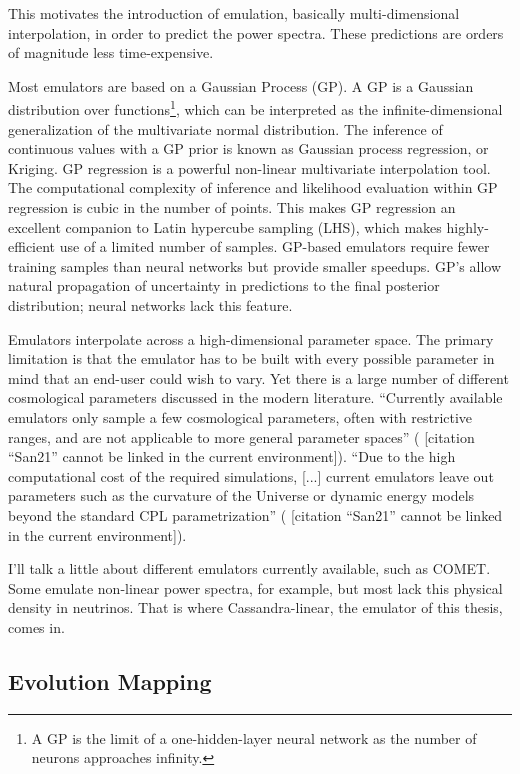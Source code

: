 \documentclass[11pt]{article}
\newcommand{\cbib}[1]
{\IfFileExists{biblatex.sty}
{\cite{#1}}
{[citation ``#1'' cannot be linked in the current environment]}}
\begin{document}
This motivates the introduction of emulation, basically multi-dimensional interpolation, in order to predict the power spectra. These predictions are orders of magnitude less time-expensive. 

Most emulators are based on a Gaussian Process (GP). A GP is a Gaussian
distribution over functions\footnote
{A GP is the limit of a one-hidden-layer neural network as the number of
neurons approaches infinity.}, which can be interpreted
as the infinite-dimensional generalization of the multivariate normal
distribution. The inference of continuous values with a GP prior
is known as Gaussian process regression, or Kriging. GP regression is a
powerful non-linear multivariate interpolation tool. The computational
complexity of inference and likelihood evaluation within GP regression is cubic
in the number of points. This makes GP regression an excellent companion to
Latin hypercube sampling (LHS), which makes highly-efficient use of a limited number of samples. GP-based emulators require fewer training samples than
neural networks but provide smaller speedups. GP's allow natural propagation of
uncertainty in predictions to the final posterior distribution; neural
networks lack this feature.

Emulators interpolate across a high-dimensional parameter space. The primary
limitation is that the emulator has to be built with every possible parameter
in mind that an end-user could wish to vary. Yet there is a large number of
different cosmological parameters discussed in the modern literature.
``Currently available emulators only sample a few cosmological parameters,
often with restrictive ranges, and are not applicable to more general parameter
spaces'' (\cbib{San21}). ``Due to the high computational cost of the required
simulations, [...] current emulators leave out parameters such as the curvature
of the Universe or dynamic energy models beyond the standard CPL
parametrization'' (\cbib{San21}).

I'll talk a little about different emulators currently available, such as COMET. Some emulate non-linear power spectra, for example, but most lack this physical density in neutrinos. That is where Cassandra-linear, the emulator of this thesis, comes in.

\begin{centering}
\subsection{Evolution Mapping}
\end{centering}
\end{document}
